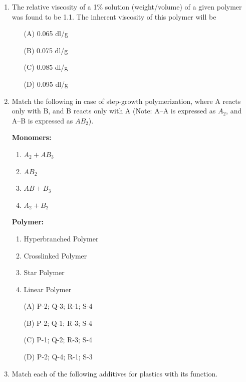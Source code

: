 \documentclass[journal,12pt,onecolumn]{IEEEtran}
\theoremstyle{remark}
\begin{document}
\begin{enumerate}
\item The relative viscosity of a 1\% solution (weight/volume) of a given polymer was found to be 1.1. The inherent viscosity of this polymer will be

\begin{multicols}{4}
\begin{enumerate}
    \item[(A)] 0.065 dl/g
    \item[(B)] 0.075 dl/g
    \item[(C)] 0.085 dl/g
    \item[(D)] 0.095 dl/g
\end{enumerate}
\end{multicols}

\item Match the following in case of step-growth polymerization, where A reacts only with B, and B reacts only with A (Note: A--A is expressed as $A_2$, and A--B is expressed as $AB_2$).

\begin{multicols}{2}
\textbf{Monomers:}
\begin{enumerate}
    \item $A_2 + AB_3$
    \item $AB_2$
    \item $AB + B_3$
    \item $A_2 + B_2$
\end{enumerate}

\textbf{Polymer:}
\begin{enumerate}
    \item Hyperbranched Polymer
    \item Crosslinked Polymer
    \item Star Polymer
    \item Linear Polymer
\end{enumerate}
\end{multicols}

\begin{multicols}{2}
\begin{enumerate}
    \item[(A)] P-2; Q-3; R-1; S-4
    \item[(B)] P-2; Q-1; R-3; S-4
    \item[(C)] P-1; Q-2; R-3; S-4
    \item[(D)] P-2; Q-4; R-1; S-3
\end{enumerate}
\end{multicols}

\item Match each of the following additives for plastics with its function.


\end{enumerate}
\end{document}
